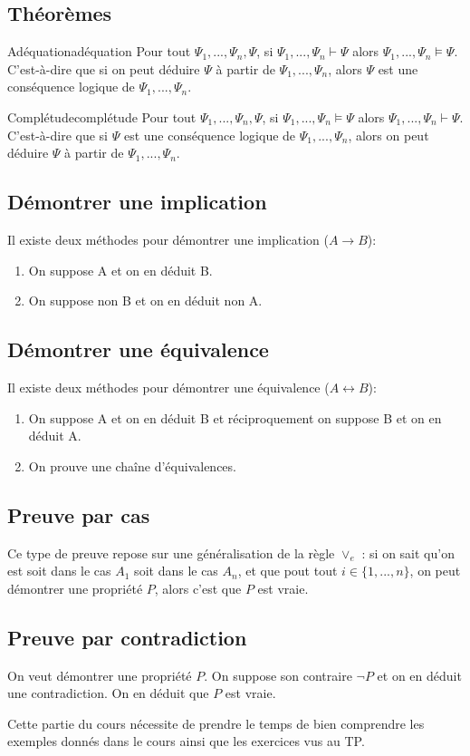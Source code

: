 \subsection{Théorèmes}
\begin{theorem}{Adéquation}{adéquation}
Pour tout $\Psi_1,...,\Psi_n,\Psi$, si $\Psi_1,...,\Psi_n\vdash\Psi$ alors $\Psi_1,...,\Psi_n\vDash\Psi$.
C'est-à-dire que si on peut déduire $\Psi$ à partir de $\Psi_1,...,\Psi_n$, alors $\Psi$ est une conséquence logique de $\Psi_1,...,\Psi_n$.
\end{theorem}
\begin{theorem}{Complétude}{complétude}
Pour tout $\Psi_1,...,\Psi_n,\Psi$, si $\Psi_1,...,\Psi_n\vDash\Psi$ alors $\Psi_1,...,\Psi_n\vdash\Psi$.
C'est-à-dire que si $\Psi$ est une conséquence logique de $\Psi_1,...,\Psi_n$, alors on peut déduire $\Psi$ à partir de $\Psi_1,...,\Psi_n$.
\end{theorem}

\subsection{Démontrer une implication}
Il existe deux méthodes pour démontrer une implication ($A\rightarrow B$):
\begin{enumerate}
    \item On suppose A et on en déduit B.
    \item On suppose non B et on en déduit non A.
\end{enumerate}

\subsection{Démontrer une équivalence}
Il existe deux méthodes pour démontrer une équivalence ($A\leftrightarrow B$):
\begin{enumerate}
    \item On suppose A et on en déduit B et réciproquement on suppose B et on en déduit A.
    \item On prouve une chaîne d'équivalences.
\end{enumerate}

\subsection{Preuve par cas}
Ce type de preuve repose sur une généralisation de la règle $\lor_e$ : si on sait qu'on est soit dans le cas $A_1$ soit dans le cas $A_n$, et que pout tout $i\in\{1,...,n\}$, on peut démontrer une propriété $P$, alors c'est que $P$ est vraie.

\subsection{Preuve par contradiction}
On veut démontrer une propriété $P$. On suppose son contraire $\neg P$ et on en déduit une contradiction. On en déduit que $P$ est vraie.

\begin{remark}
Cette partie du cours nécessite de prendre le temps de bien comprendre les exemples donnés dans le cours ainsi que les exercices vus au TP.
\end{remark}

